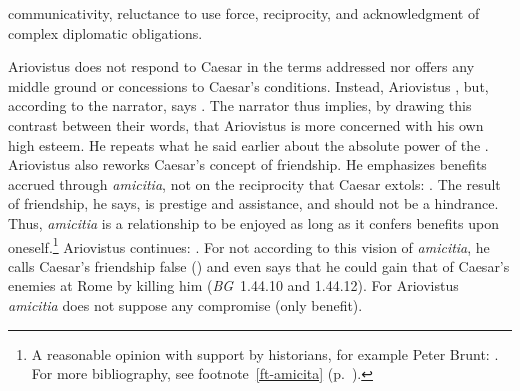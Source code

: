\documentclass[12pt,letterpaper,oneside,final]{memoir}
\begin{document}
communicativity, reluctance to use force, reciprocity, and acknowledgment of complex diplomatic obligations.

Ariovistus does not respond to Caesar in the terms addressed nor offers any middle ground or concessions to Caesar's conditions. Instead, Ariovistus , but, according to the narrator, says . The narrator thus implies, by drawing this contrast between their words, that Ariovistus is more concerned with his own high esteem. He repeats what he said earlier about the absolute power of the . Ariovistus also reworks Caesar's concept of friendship. He emphasizes benefits accrued through \emph{amicitia}, not on the reciprocity that Caesar extols: . The result of friendship, he says, is prestige and assistance, and should not be a hindrance. Thus, \emph{amicitia} is a relationship to be enjoyed as long as it confers benefits upon oneself.\footnote{A reasonable opinion with support by historians, for example Peter Brunt: . For more bibliography, see footnote~\ref{ft-amicita} (p.~\pageref{ft-amicita}).} Ariovistus continues: . For not according to this vision of \emph{amicitia}, he calls Caesar's friendship false () and even says that he could gain that of Caesar's enemies at Rome by killing him (\emph{BG}~1.44.10 and 1.44.12). For Ariovistus \emph{amicitia} does not suppose any compromise (only benefit).
\end{document}
